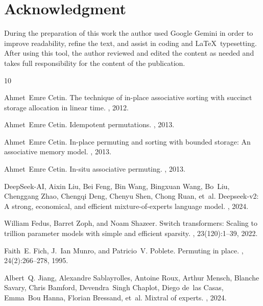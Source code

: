 \documentclass[10pt,twocolumn]{article}
\begin{document}
\section*{Acknowledgment}
During the preparation of this work the author used Google Gemini in order to improve readability, refine the text, and assist in coding and \LaTeX\ typesetting. After using this tool, the author reviewed and edited the content as needed and takes full responsibility for the content of the publication.

\begingroup
\footnotesize
\setlength{\itemsep}{0pt plus 0.2pt}
\begin{thebibliography}{10}

Ahmet~Emre Cetin.
\newblock The technique of in-place associative sorting with succinct storage allocation in linear time.
, 2012.

Ahmet~Emre Cetin.
\newblock Idempotent permutations.
, 2013.

Ahmet~Emre Cetin.
\newblock In-place permuting and sorting with bounded storage: An associative memory model.
, 2013.

Ahmet~Emre Cetin.
\newblock In-situ associative permuting.
, 2013.

{DeepSeek-AI}, Aixin Liu, Bei Feng, Bin Wang, Bingxuan Wang, Bo~Liu, Chenggang Zhao, Chengqi Deng, Chenyu Shen, Chong Ruan, et~al.
\newblock Deepseek-v2: A strong, economical, and efficient mixture-of-experts language model.
, 2024.

William Fedus, Barret Zoph, and Noam Shazeer.
\newblock Switch transformers: Scaling to trillion parameter models with simple and efficient sparsity.
, 23(120):1--39, 2022.

Faith~E. Fich, J.~Ian Munro, and Patricio~V. Poblete.
\newblock Permuting in place.
, 24(2):266--278, 1995.

Albert~Q. Jiang, Alexandre Sablayrolles, Antoine Roux, Arthur Mensch, Blanche Savary, Chris Bamford, Devendra~Singh Chaplot, Diego de~las Casas, Emma~Bou Hanna, Florian Bressand, et~al.
\newblock Mixtral of experts.
, 2024.


\end{thebibliography}
\end{document}
